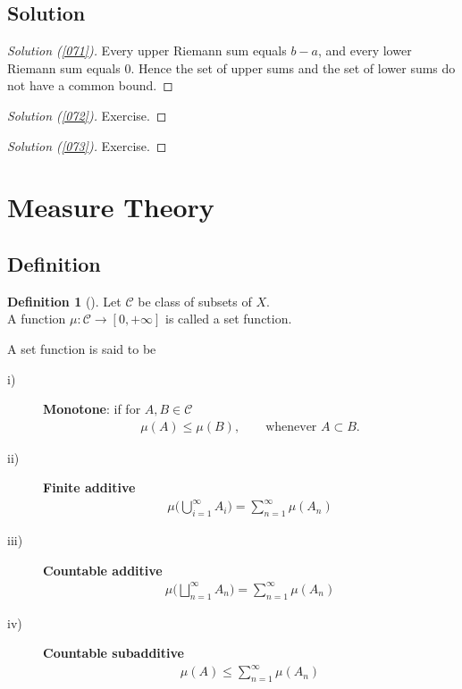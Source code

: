 \documentclass[	DIV=calc,paper=a4,fontsize=11pt]{scrartcl}	 	%
\theoremstyle{definition}
\newtheorem{defn}[thm]{Definition}
\theoremstyle{plain}
\theoremstyle{remark}
\begin{document}
\newpage
\subsection*{Solution}
\begin{proof}[Solution (\ref{071})]
Every upper Riemann sum equals $b-a$, and every lower Riemann sum equals $0$. Hence the set of upper sums and the set of lower sums do not have a common bound.
\end{proof}
\begin{proof}[Solution (\ref{072})]
Exercise.
\end{proof}
\begin{proof}[Solution (\ref{073})]
Exercise.
\end{proof}
\newpage
\section{Measure Theory}

\subsection{Definition}

\begin{defn}[\textbf{\color{blue}{Set function}}] Let $\mathcal{C}$ be class of subsets of $X$.\\
A function $\mu:\mathcal{C}\to [0,+\infty]$ is called a set function.
\end{defn}

A set function is said to be
\begin{description}
  \item[i)]  \textbf{Monotone}: if for $A,B\in \mathcal{C}$
  \begin{align*}\mu(A)\leq \mu(B),\qquad \text{whenever }A\subset B.\end{align*}
  \item[ii)] \textbf{Finite additive}
  \begin{align*} \mu\biggl(\bigcup_{i=1}^{\infty} A_i\biggl)=\sum_{n=1}^{\infty}\mu(A_n)\end{align*}
  \item[iii)] \textbf{Countable additive}
  \begin{align*} \mu\biggl(\bigsqcup_{n=1}^{\infty}A_n\biggl)=\sum_{n=1}^{\infty}\mu(A_n)\end{align*}
  \item[iv)] \textbf{Countable subadditive}
  \begin{align*} \mu(A)\leq \sum_{n=1}^{\infty}\mu(A_n)\end{align*}
\end{description}
\end{document}
